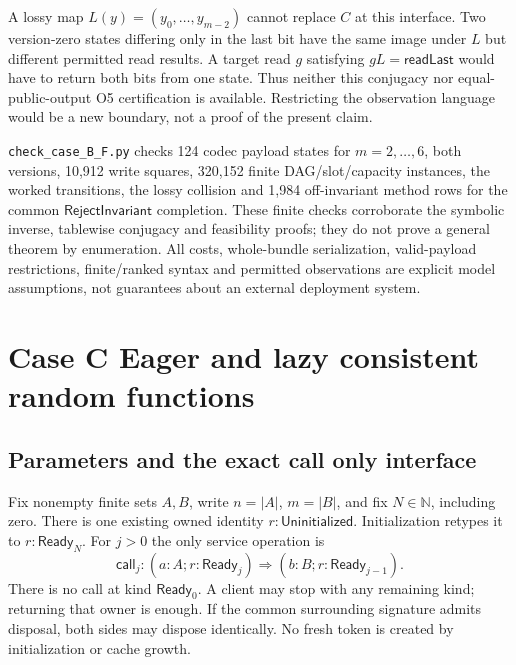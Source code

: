 \documentclass[11pt,a4paper]{article}
\theoremstyle{definition}
\begin{document}
A lossy map $L(y)=(y_0,\ldots,y_{m-2})$ cannot replace $C$ at this
interface. Two version-zero states differing only in the last bit have
the same image under $L$ but different permitted read results. A target
read $g$ satisfying $gL=\mathsf{readLast}$ would have to return both
bits from one state. Thus neither this conjugacy nor equal-public-output
O5 certification is available. Restricting the observation language
would be a new boundary, not a proof of the present claim.

\texttt{check\_case\_B\_F.py} checks 124 codec payload states for
$m=2,\ldots,6$, both versions, 10,912 write squares, 320,152 finite
DAG/slot/capacity instances, the worked transitions, the lossy collision and 1,984 off-invariant
method rows for the common $\mathsf{RejectInvariant}$ completion.
These finite checks corroborate the symbolic inverse, tablewise
conjugacy and feasibility proofs; they do not prove a general theorem
by enumeration. All costs, whole-bundle serialization, valid-payload
restrictions, finite/ranked syntax and permitted observations are explicit
model assumptions, not guarantees about an external deployment system.


\section{Case C Eager and lazy consistent random functions}\label{sec:caseC}

\subsection{Parameters and the exact call only interface}
Fix nonempty finite sets $A,B$, write $n=|A|$, $m=|B|$, and fix
$N\in\mathbb N$, including zero. There is one existing owned identity
$r:\mathsf{Uninitialized}$. Initialization retypes it to
$r:\mathsf{Ready}_N$. For $j>0$ the only service operation is
\[
\mathsf{call}_j:(a:A;r:\mathsf{Ready}_j)
\Rightarrow(b:B;r:\mathsf{Ready}_{j-1}).
\]
There is no call at kind $\mathsf{Ready}_0$. A client may stop with any
remaining kind; returning that owner is enough. If the common surrounding
signature admits disposal, both sides may dispose identically. No fresh
token is created by initialization or cache growth.
\end{document}
